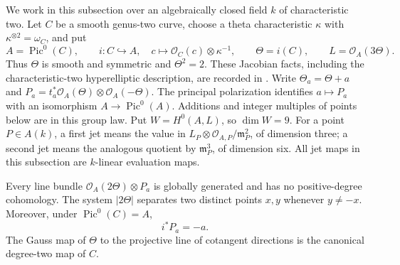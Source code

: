 We work in this subsection over an algebraically closed field $k$ of
characteristic two. Let $C$ be a smooth genus-two curve, choose a theta
characteristic $\kappa$ with $\kappa^{\otimes2}=\omega_C$, and put
\[
 A=\operatorname{Pic}^0(C),\qquad
 i:C\hookrightarrow A,\quad c\longmapsto\mathcal O_C(c)\otimes\kappa^{-1},
 \qquad \Theta=i(C),\qquad L=\mathcal O_A(3\Theta).
\]
Thus $\Theta$ is smooth and symmetric and $\Theta^2=2$. These Jacobian facts, including the characteristic-two
hyperelliptic description, are recorded in
\cite[Theorem~14.23 and Corollary~14.24, pp.~230--231; Theorem~14.29, p.~233;
Example~14.34, pp.~236--237]{EdixhovenVanDerGeerMoonenAV}.
Write $\Theta_a=\Theta+a$ and
$P_a=t_a^*\mathcal O_A(\Theta)\otimes\mathcal O_A(-\Theta)$.
The principal polarization identifies $a\mapsto P_a$ with an isomorphism
$A\to\operatorname{Pic}^0(A)$. Additions and integer multiples of points
below are in this group law. Put $W=H^0(A,L)$, so $\dim W=9$.
For a point $P\in A(k)$, a first jet means the value in
$L_P\otimes\mathcal O_{A,P}/\mathfrak m_P^2$, of dimension three;
a second jet means the analogous quotient by $\mathfrak m_P^3$, of
dimension six. All jet maps in this subsection are $k$-linear evaluation maps.

\begin{lemma}\label{lem:ppav-theta-preliminaries}
Every line bundle $\mathcal O_A(2\Theta)\otimes P_a$ is globally generated
and has no positive-degree cohomology. The system $|2\Theta|$ separates
two distinct points $x,y$ whenever $y\ne -x$.
Moreover, under $\operatorname{Pic}^0(C)=A$,
\[
                     i^*P_a=-a.
\]
The Gauss map of $\Theta$ to the projective line of cotangent directions
is the canonical degree-two map of $C$.
\end{lemma}

